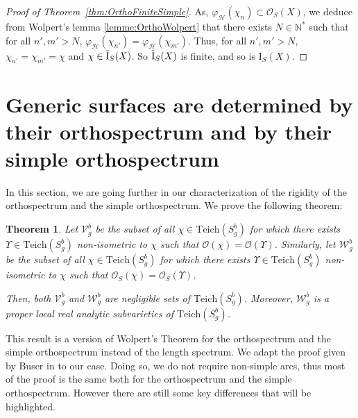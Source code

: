 \documentclass[a4paper,12pt]{article}
\newtheorem{theorem}{Theorem}[section]
\theoremstyle{definition}
\theoremstyle{remark}
\begin{document}
\begin{proof}[Proof of Theorem~\ref{thm:OrthoFiniteSimple}]
    As, $\varphi_{\mathcal{H}}(\chi_n) \subset \mathcal{O}_S(X)$, we deduce from Wolpert's lemma \ref{lemme:OrthoWolpert} that there exists $N \in \mathbb{N}^*$ such that for all $n', m' >N$, $\varphi_{\mathcal{H}}(\chi_{n'})=\varphi_{\mathcal{H}}(\chi_{m'})$. Thus, for all $n', m' > N$, $\chi_{n'} = \chi_{m'} = \chi $ and $\chi \in \Tilde{\mathrm{I}}_S(X)$. So $\Tilde{\mathrm{I}}_S(X)$ is finite, and so is $\mathrm{I}_S(X)$. 
    
\end{proof}




















\section{Generic surfaces are determined by their orthospectrum and by their simple orthospectrum}\label{sec:3}

In this section, we are going further in our characterization of the rigidity of the orthospectrum and the simple orthospectrum. We prove the following theorem:

\begin{theorem}\label{thm:Main2}
    Let $\mathcal{V}_g^b$ be the subset of all $\chi \in \mathrm{Teich}(S_g^b)$ for which there exists\\
    $\Upsilon \in \mathrm{Teich}(S_g^b)$ non-isometric to $\chi$ such that $\mathcal{O}(\chi)=\mathcal{O}(\Upsilon)$. Similarly, let $\mathcal{W}_g^b$ be the subset of all $\chi \in \mathrm{Teich}(S_g^b)$ for which there exists $\Upsilon \in \mathrm{Teich}(S_g^b)$ non-isometric to $\chi$ such that $\mathcal{O}_S(\chi)=\mathcal{O}_S(\Upsilon)$. 
    
    Then, both $\mathcal{V}_g^b$ and $\mathcal{W}_g^b$ are negligible sets of $\mathrm{Teich}(S_g^b)$. Moreover, $\mathcal{W}_g^b$ is a proper local real analytic subvarieties of $\mathrm{Teich}(S_g^b)$.
\end{theorem}

This result is a version of Wolpert's Theorem \cite{Wolpert} for the orthospectrum and the simple orthospectrum instead of the length spectrum. We adapt the proof given by Buser in \cite[Chap. 10]{buser} to our case. Doing so, we do not require non-simple arcs, thus most of the proof is the same both for the orthospectrum and the simple orthospectrum. However there are still some key differences that will be highlighted.\\
\end{document}
